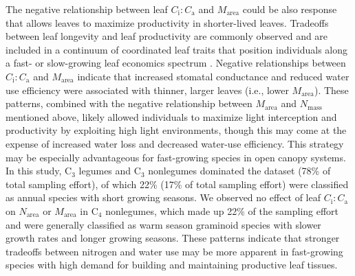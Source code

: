 The negative relationship between leaf $C_\mathrm{i}\mathrm{:}C_\mathrm{a}$ and $M_\mathrm{area}$ could be also response that allows leaves to maximize productivity in shorter-lived leaves. Tradeoffs between leaf longevity and leaf productivity are commonly observed and are included in a continuum of coordinated leaf traits that position individuals along a fast- or slow-growing leaf economics spectrum . Negative relationships between $C_\mathrm{i}\mathrm{:}C_\mathrm{a}$ and $M_\mathrm{area}$ indicate that increased stomatal conductance and reduced water use efficiency were associated with thinner, larger leaves (i.e., lower $M_\mathrm{area}$). These patterns, combined with the negative relationship between $M_\mathrm{area}$ and $N_\mathrm{mass}$ mentioned above, likely allowed individuals to maximize light interception and productivity by exploiting high light environments, though this may come at the expense of increased water loss and decreased water-use efficiency. This strategy may be especially advantageous for fast-growing species in open canopy systems. In this study, C$_3$ legumes and C$_3$ nonlegumes dominated the dataset (78\% of total sampling effort), of which 22\% (17\% of total sampling effort) were classified as annual species with short growing seasons. We observed no effect of leaf $C_\mathrm{i}\mathrm{:}C_\mathrm{a}$ on $N_\mathrm{area}$ or $M_\mathrm{area}$ in C$_4$ nonlegumes, which made up 22\% of the sampling effort and were generally classified as warm season graminoid species with slower growth rates and longer growing seasons. These patterns indicate that stronger tradeoffs between nitrogen and water use may be more apparent in fast-growing species with high demand for building and maintaining productive leaf tissues.

